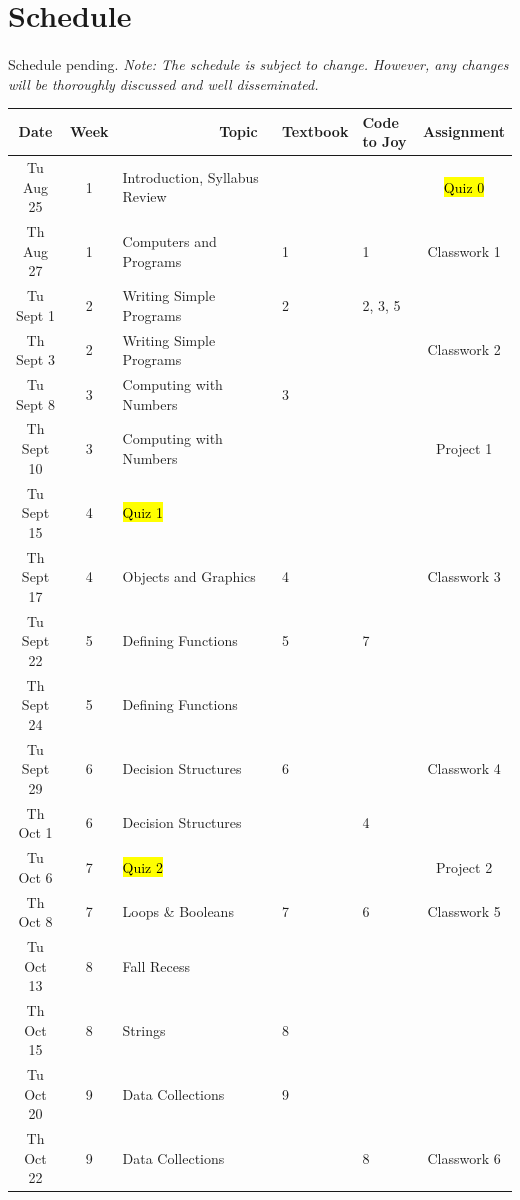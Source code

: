 \documentclass[letter,10pt]{article}
\begin{document}
\section*{Schedule}\label{sec:schedule}
\paragraph{}Schedule pending.
\textit{Note: The schedule is subject to change. However, any changes will be thoroughly discussed and well disseminated.}

\small
\begin{tabular}{c c l l l c}
Date    & Week & ~~~~~~~~~~~~Topic & Textbook & Code to Joy & Assignment \\ \hline
Tu Aug 25  & 1  & Introduction, Syllabus Review &  & & \hl{Quiz 0} \\ 
Th Aug 27  & 1  & Computers and Programs & 1 & 1 & Classwork 1  \\ \hline
Tu Sept 1  & 2  & Writing Simple Programs & 2 & 2, 3, 5 & \\
Th Sept 3  & 2  & Writing Simple Programs & & &  Classwork 2 \\
Tu Sept 8  & 3  & Computing with Numbers & 3 & &  \\
Th Sept 10 & 3  & Computing with Numbers & &  &  Project 1 \\
Tu Sept 15 & 4  & \hl{Quiz 1} & & & \\
Th Sept 17 & 4  & Objects and Graphics & 4 & & Classwork 3 \\
Tu Sept 22 & 5  & Defining Functions & 5 & 7 & \\
Th Sept 24 & 5  & Defining Functions & & & \\
Tu Sept 29 & 6  & Decision Structures & 6 & &Classwork 4 \\ \hline
Th Oct 1   & 6  & Decision Structures & & 4 &  \\
Tu Oct 6   & 7  & \hl{Quiz 2} & & & Project 2\\
Th Oct 8   & 7  & Loops \& Booleans & 7 & 6 & Classwork 5 \\
Tu Oct 13  & 8  & {\color{cadmiumgreen}Fall Recess} & & & \\
Th Oct 15  & 8  & Strings  & 8 & & \\
Tu Oct 20  & 9  & Data Collections & 9 & & \\
Th Oct 22  & 9  & Data Collections &  & 8 & Classwork 6 \\

\end{tabular}
\end{document}
